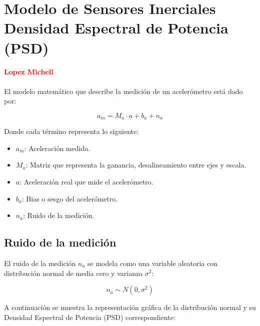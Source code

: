 \documentclass[11pt,a4paper]{article}
\begin{document}
 
\section{Modelo de Sensores Inerciales Densidad Espectral de Potencia (PSD)}
 \paragraph{\textcolor{red} {Lopez Michell}}
El modelo matemático que describe la medición de un acelerómetro está dado por:
 
\begin{equation}
    a_m = M_a \cdot a + b_a + n_a
\end{equation}
 
Donde cada término representa lo siguiente:
 
\begin{itemize}
    \item $a_m$: Aceleración medida.
    \item $M_a$: Matriz que representa la ganancia, desalineamiento entre ejes y escala.
    \item $a$: Aceleración real que mide el acelerómetro.
    \item $b_a$: Bias o sesgo del acelerómetro.
    \item $n_a$: Ruido de la medición.
\end{itemize}
 
\subsection{Ruido de la medición}
 
El ruido de la medición $n_a$ se modela como una variable aleatoria con distribución normal de media cero y varianza $\sigma^2$:
 
\begin{equation}
    n_a \sim N(0, \sigma^2)
\end{equation}
 
A continuación se muestra la representación gráfica de la distribución normal y su Densidad Espectral de Potencia (PSD) correspondiente:
 
\end{document}
